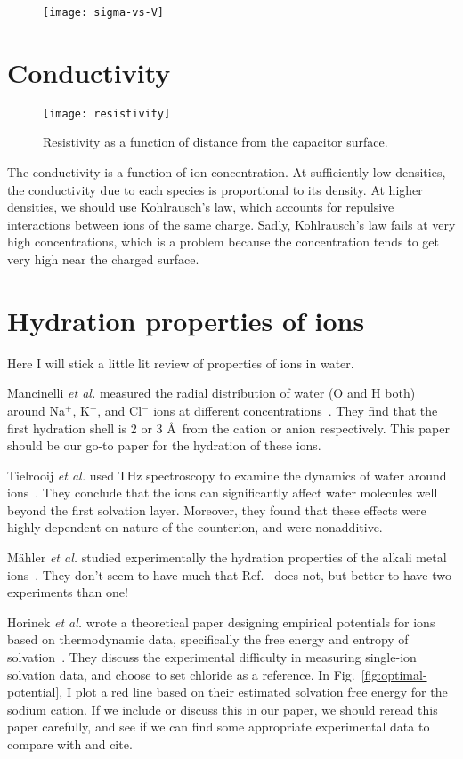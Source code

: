 \documentclass[twocolumn]{revtex4-1}
\begin{document}
\begin{figure}
  \texttt{[image: sigma-vs-V]}
\end{figure}

\section{Conductivity}

\begin{figure}
  \texttt{[image: resistivity]}
  \caption{Resistivity as a function of distance from the capacitor
    surface.}
\end{figure}

The conductivity is a function of ion concentration.  At sufficiently
low densities, the conductivity due to each species is proportional to
its density.  At higher densities, we should use Kohlrausch's law,
which accounts for repulsive interactions between ions of the same
charge.  Sadly, Kohlrausch's law fails at very high concentrations,
which is a problem because the concentration tends to get very high
near the charged surface.

\section{Hydration properties of ions}
Here I will stick a little lit review of properties of ions in water.

Mancinelli \emph{et al.} measured the radial distribution of water (O
and H both) around Na$^+$, K$^+$, and Cl$^-$ ions at different
concentrations~\cite{mancinelli2007hydration}.  They find that the
first hydration shell is 2 or 3 \AA\ from the cation or anion
respectively.  This paper should be our go-to paper for the hydration
of these ions.

Tielrooij \emph{et al.} used THz spectroscopy to examine the dynamics
of water around ions~\cite{tielrooij2010cooperativity}.  They conclude
that the ions can significantly affect water molecules well beyond the
first solvation layer.  Moreover, they found that these effects were
highly dependent on nature of the counterion, and were nonadditive.

M\"ahler \emph{et al.} studied experimentally the hydration properties
of the alkali metal ions~\cite{mahler2011study}.  They don't seem to
have much that Ref.~ does not, but
better to have two experiments than one!

Horinek \emph{et al.} wrote a theoretical paper designing empirical
potentials for ions based on thermodynamic data, specifically the free
energy and entropy of solvation~\cite{horinek2009rational}.  They
discuss the experimental difficulty in measuring single-ion solvation
data, and choose to set chloride as a reference.  In
Fig.~\ref{fig:optimal-potential}, I plot a red line based on their
estimated solvation free energy for the sodium cation.  If we include
or discuss this in our paper, we should reread this paper carefully,
and see if we can find some appropriate experimental data to compare
with and cite.



\end{document}
